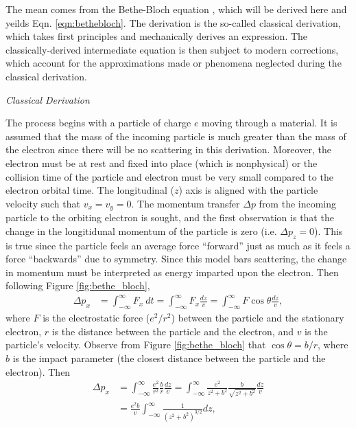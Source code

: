 The mean comes from the Bethe-Bloch equation \cite{bethebloch}, which will be derived here and yeilds Eqn. \ref{eqn:bethebloch}. The derivation is the so-called classical derivation, which takes first principles and mechanically derives an expression. The classically-derived intermediate equation is then subject to modern corrections, which account for the approximations made or phenomena neglected during the classical derivation.

\noindent \textit{\large Classical Derivation}

The process begins with a particle of charge $e$ moving through a material. It is assumed that the mass of the incoming particle is much greater than the mass of the electron since there will be no scattering in this derivation. Moreover, the electron must be at rest and fixed into place (which is nonphysical) or the collision time of the particle and electron must be very small compared to the electron orbital time. The longitudinal ($z$) axis is aligned with the particle velocity such that $v_x=v_y=0$. The momentum transfer $\Delta p$ from the incoming particle to the orbiting electron is sought, and the first observation is that the change in the longitidunal momentum of the particle is zero (i.e. $\Delta p_z=0$). This is true since the particle feels an average force ``forward'' just as much as it feels a force ``backwards'' due to symmetry. Since this model bars scattering, the change in momentum must be interpreted as energy imparted upon the electron. Then following Figure \ref{fig:bethe_bloch},
\begin{align*}
\Delta p_x &=\int_{-\infty} ^\infty F_x \ dt = \int_{-\infty} ^{\infty} F_x \frac{dz}{v} = \int_{-\infty} ^{\infty} F\cos{\theta}\frac{dz}{v},
\end{align*}
where $F$ is the electrostatic force ($e^2/r^2$) between the particle and the stationary electron, $r$ is the distance between the particle and the electron, and $v$ is the particle's velocity. Observe from Figure \ref{fig:bethe_bloch} that $\cos\theta = b/r$, where $b$ is the impact parameter (the closest distance between the particle and the electron). Then
\begin{align*}
\Delta p_x &= \int_{-\infty} ^{\infty} \frac{e^2}{r^2} \frac{b}{r} \frac{dz}{v} = \int_{-\infty} ^{\infty} \frac{e^2}{z^2+b^2} \frac{b}{\sqrt{z^2+b^2}} \frac{dz}{v}\\
&= \frac{e^2 b}{v} \int_{-\infty} ^{\infty} \frac{1}{(z^2+b^2)^{3/2}}dz,
\end{align*}
